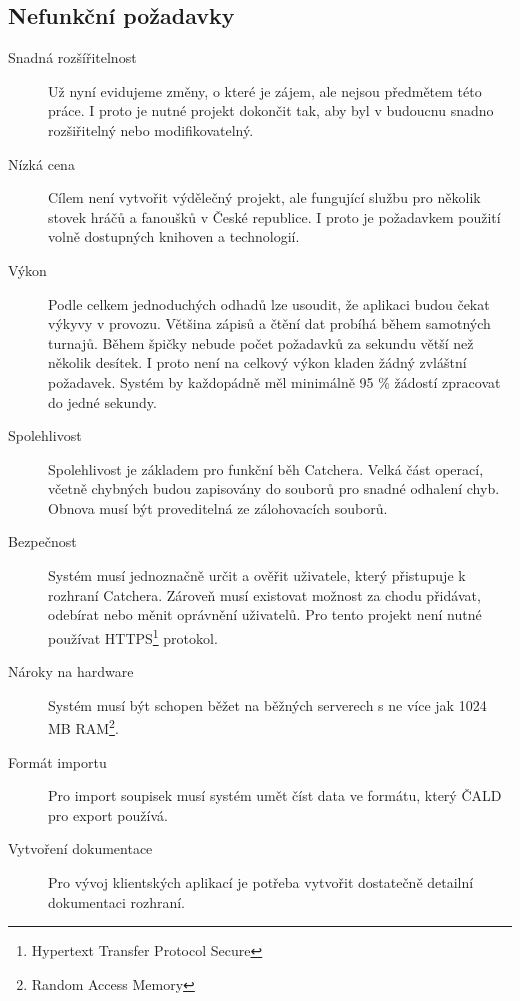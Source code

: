 \subsection{Nefunkční požadavky}

\begin{description}
  \item[Snadná rozšířitelnost]
    Už nyní evidujeme změny, o které je zájem, ale nejsou předmětem této práce.
    I proto je nutné projekt dokončit tak, aby byl v budoucnu snadno rozšiřitelný nebo
    modifikovatelný.
  \item[Nízká cena]
    Cílem není vytvořit výdělečný projekt, ale fungující službu pro několik stovek hráčů
    a fanoušků v České republice. I proto je požadavkem použití volně dostupných
    knihoven a technologií.
  \item[Výkon]
    Podle celkem jednoduchých odhadů lze usoudit, že aplikaci budou čekat výkyvy v provozu.
    Většina zápisů a čtění dat probíhá během samotných turnajů. Během špičky nebude počet požadavků za sekundu
    větší než několik desítek. I proto není na celkový výkon kladen žádný zvláštní požadavek.
    Systém by každopádně měl minimálně 95 \% žádostí zpracovat do jedné sekundy.
  \item[Spolehlivost]
    Spolehlivost je základem pro funkční běh Catchera. Velká část operací, včetně chybných budou
    zapisovány do souborů pro snadné odhalení chyb. Obnova musí být proveditelná ze zálohovacích souborů.
    \item[Bezpečnost]
    Systém musí jednoznačně určit a ověřit uživatele, který přistupuje k rozhraní Catchera. Zároveň
    musí existovat možnost za chodu přidávat, odebírat nebo měnit oprávnění uživatelů.
    Pro tento projekt není nutné používat HTTPS\footnote{Hypertext Transfer Protocol Secure} protokol.
  \item[Nároky na hardware]
    Systém musí být schopen běžet na běžných serverech s ne více jak 1024 MB RAM\footnote{Random Access Memory}.
  \item[Formát importu]
    Pro import soupisek musí systém umět číst data ve formátu, který ČALD pro export používá.
  \item[Vytvoření dokumentace]
    Pro vývoj klientských aplikací je potřeba vytvořit dostatečně detailní dokumentaci rozhraní.
\end{description}

